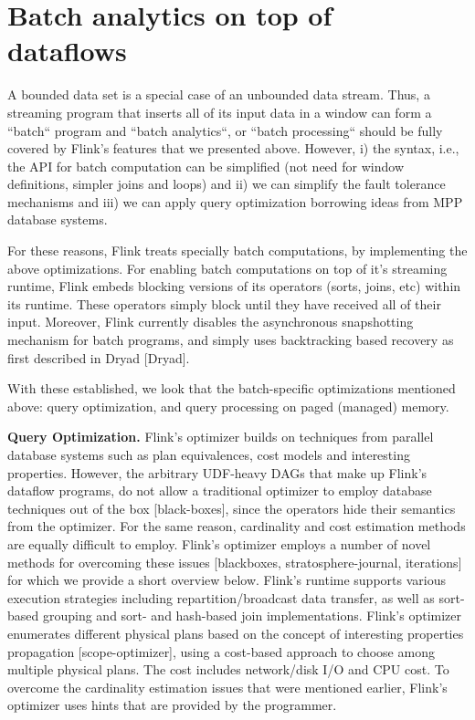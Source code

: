 \documentclass{sig-alternate}
\begin{document}
\section{Batch analytics on top of \\ dataflows}

A bounded data set is a special case of an unbounded data stream. Thus, a streaming program that inserts all of its input data in a window can form a ``batch`` program and ``batch analytics``, or ``batch processing`` should be fully covered by Flink's features that we presented above. However, i) the syntax, i.e., the API for batch computation can be simplified (not need for window definitions, simpler joins and loops) and ii) we can simplify the fault tolerance mechanisms and iii) we can apply query optimization borrowing ideas from MPP database systems.

For these reasons, Flink treats specially batch computations, by implementing the above optimizations. For enabling batch computations on top of it's streaming runtime, Flink embeds blocking versions of its operators (sorts, joins, etc) within its runtime. These operators simply block until they have received all of their input. Moreover, Flink currently disables the asynchronous snapshotting mechanism for batch programs, and simply uses backtracking based recovery as first described in Dryad [Dryad].

With these established, we look that the batch-specific optimizations mentioned above: query optimization, and query processing on paged (managed) memory.

\textbf{Query Optimization.} Flink's optimizer builds on techniques from parallel database systems such as plan equivalences, cost models and interesting properties. However, the arbitrary UDF-heavy DAGs that make up Flink's dataflow programs, do not allow a traditional optimizer to employ database techniques out of the box [black-boxes], since the operators hide their semantics from the optimizer. For the same reason, cardinality and cost estimation methods are equally difficult to employ. Flink's optimizer employs a number of novel methods for overcoming these issues [blackboxes, stratosphere-journal, iterations] for which we provide a short overview below. Flink's runtime supports various execution strategies including repartition/broadcast data transfer, as well as sort-based grouping and sort- and hash-based join implementations. Flink's optimizer enumerates different physical plans based on the concept of interesting properties propagation [scope-optimizer], using a cost-based approach to choose among multiple physical plans. The cost includes network/disk I/O and CPU cost. To overcome the cardinality estimation issues that were mentioned earlier,  Flink's optimizer uses hints that are provided by the programmer.
\end{document}
